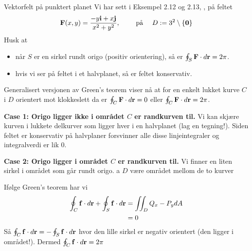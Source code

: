 \begin{eks}{Vektorfelt på punktert planet}
Vi har sett i Eksempel 2.12 og 2.13, , på feltet 
\[\mathbf{F}(x,y) = \frac{-y\mathbf{i}+x\mathbf{j}}{x^2+y^2}, \qquad \text{ på }\quad  D:= 3^2 \setminus \{\mathbf{0}\}\]
Husk at
\begin{itemize}
\item når $S$ er en sirkel rundt origo (positiv orientering), så er $\oint_S \mathbf{F}\cdot d\mathbf{r}=2\pi$. 
\item hvis vi ser på feltet i et halvplanet, så er feltet konservativ.
\end{itemize}
Generalisert versjonen av Green's teorem viser nå at for en enkelt lukket kurve $C$ i $D$ orientert mot klokkeslett da er $\oint_C \mathbf{F}\cdot d\mathbf{r} = 0$ eller $\oint_C \mathbf{F}\cdot d\mathbf{r} = 2\pi$.
\smallskip

\textbf{Case 1: Origo ligger ikke i området $C$ er randkurven til.} Vi kan skjære kurven i lukkete delkurver som ligger hver i en halvplanet (lag en tegning!). Siden feltet er konservativ på halvplaner forsvinner alle disse linjeintegraler og integralverdi er lik $0$.\smallskip

\textbf{Case 2: Origo ligger i området $C$ er randkurven til.}
Vi finner en liten sirkel i området som går rundt origo. a $D$ være området mellom de to kurver

\begin{minipage}{6cm}
Ifølge Green's teorem har vi \begin{align*}
\oint_C \mathbf{f}\cdot d\mathbf{r} + \oint_{S} \mathbf{f}\cdot d\mathbf{r}&=\iint_D Q_x - P_y dA  \\
&=0
\end{align*}
Så $\oint_C \mathbf{f}\cdot d\mathbf{r} =- \oint_{S} \mathbf{f}\cdot d\mathbf{r}$ hvor den lille sirkel er negativ orientert (den ligger i området!). Dermed $\oint_C \mathbf{f}\cdot d\mathbf{r} =2\pi$
\end{minipage}
\begin{minipage}{5cm}
\end{minipage}
\end{eks}

